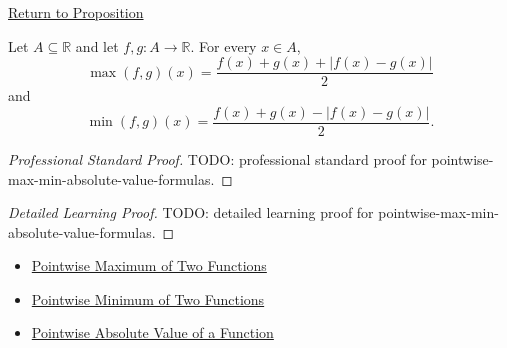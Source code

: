 \newpage
{}
\label{prf:pointwise-max-min-absolute-value-formulas}

\begin{remark*}[Return]
\hyperref[prop:pointwise-max-min-absolute-value-formulas]{Return to Proposition}
\end{remark*}

\begin{proposition*}
Let \(A\subseteq\mathbb{R}\) and let \(f,g:A\to\mathbb{R}\).  For every
\(x\in A\),
\[
  \max(f,g)(x)=\frac{f(x)+g(x)+|f(x)-g(x)|}{2}
\]
and
\[
  \min(f,g)(x)=\frac{f(x)+g(x)-|f(x)-g(x)|}{2}.
\]
\end{proposition*}

\begin{proof}[Professional Standard Proof]
\LRAProofBodyStart
TODO: professional standard proof for pointwise-max-min-absolute-value-formulas.
\end{proof}

\begin{proof}[Detailed Learning Proof]
\LRAProofBodyStart
TODO: detailed learning proof for pointwise-max-min-absolute-value-formulas.
\end{proof}

\begin{remark*}
\end{remark*}

\begin{dependencies}
\begin{itemize}
  \item \hyperref[def:pointwise-maximum-of-two-functions]{Pointwise Maximum of Two Functions}
  \item \hyperref[def:pointwise-minimum-of-two-functions]{Pointwise Minimum of Two Functions}
  \item \hyperref[def:pointwise-absolute-value-of-a-function]{Pointwise Absolute Value of a Function}
\end{itemize}
\end{dependencies}

\clearpage
